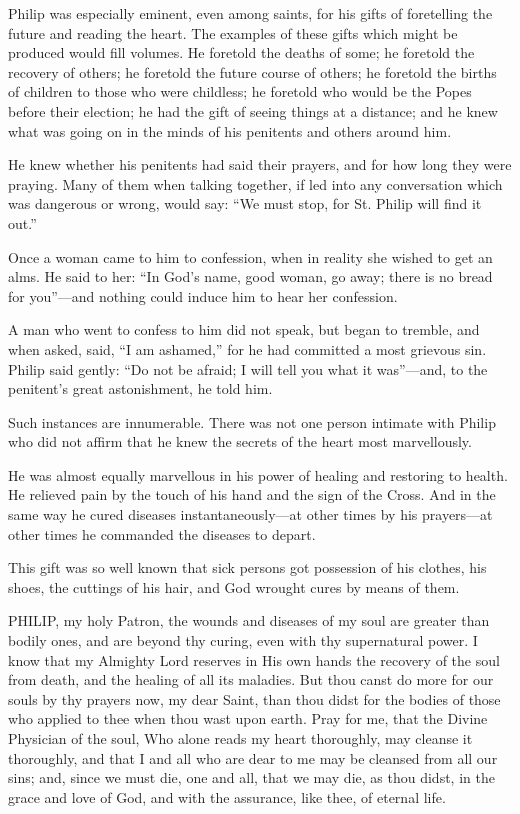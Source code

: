 Philip was especially eminent,
even among saints, for his gifts of foretelling the future and reading
the heart. The examples of these gifts which might be produced would
fill volumes. He foretold the deaths of some; he foretold the recovery
of others; he foretold the future course of others; he foretold the
births of children to those who were childless; he foretold who would be
the Popes before their election; he had the gift of seeing things at a
distance; and he knew what was going on in the minds of his penitents
and others around him.

He knew whether his penitents
had said their prayers, and for how long they were praying. Many of them
when talking together, if led into any conversation which was dangerous
or wrong, would say: ``We must stop, for St. Philip will find it out.''

Once a woman came to him to
confession, when in reality she wished to get an alms. He said to her: ``In
God's name, good woman, go away; there is no bread for you''—and
nothing could induce him to hear her confession.

A man who went to confess to him
did not speak, but began to tremble, and when asked, said, ``I am
ashamed,'' for he had committed a most grievous sin. Philip said gently: ``Do
not be afraid; I will tell you what it was''—and, to the penitent's
great astonishment, he told him.

Such instances are innumerable.
There was not one person intimate with Philip who did not affirm that he
knew the secrets of the heart most marvellously.

He was almost equally marvellous
in his power of healing and restoring to health. He relieved pain by the
touch of his hand and the sign of the Cross. And in the same way he
cured diseases instantaneously—at other times by his prayers—at
other times he commanded the diseases to depart.

This gift was so well known that
sick persons got possession of his clothes, his shoes, the cuttings of
his hair, and God wrought cures by means of them.


PHILIP, my holy
Patron, the wounds and diseases of my soul are greater than bodily ones,
and are beyond thy curing, even with thy supernatural power. I know that
my Almighty Lord reserves in His own hands the recovery of the soul from
death, and the healing of all its maladies. But thou canst do more for
our souls by thy prayers now, my dear Saint, than thou didst for the
bodies of those who applied to thee when thou wast upon earth. Pray for
me, that the Divine Physician of the soul, Who alone reads my heart
thoroughly, may cleanse it thoroughly, and that I and all who are dear
to me may be cleansed from all our sins; and, since we must die, one and
all, that we may die, as thou didst, in the grace and love of God, and
with the assurance, like thee, of eternal life.

